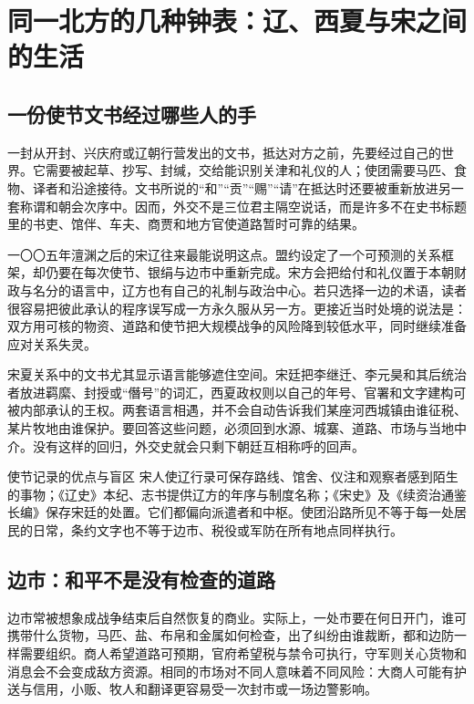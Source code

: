 \section{同一北方的几种钟表：辽、西夏与宋之间的生活}

\subsection{一份使节文书经过哪些人的手}

一封从开封、兴庆府或辽朝行营发出的文书，抵达对方之前，先要经过自己的世界。它需要被起草、抄写、封缄，交给能识别关津和礼仪的人；使团需要马匹、食物、译者和沿途接待。文书所说的“和”“贡”“赐”“请”在抵达时还要被重新放进另一套称谓和朝会次序中。因而，外交不是三位君主隔空说话，而是许多不在史书标题里的书吏、馆伴、车夫、商贾和地方官使道路暂时可靠的结果。

一〇〇五年澶渊之后的宋辽往来最能说明这点。盟约设定了一个可预测的关系框架，却仍要在每次使节、银绢与边市中重新完成。宋方会把给付和礼仪置于本朝财政与名分的语言中，辽方也有自己的礼制与政治中心。若只选择一边的术语，读者很容易把彼此承认的程序误写成一方永久服从另一方。更接近当时处境的说法是：双方用可核的物资、道路和使节把大规模战争的风险降到较低水平，同时继续准备应对关系失灵。

宋夏关系中的文书尤其显示语言能够遮住空间。宋廷把李继迁、李元昊和其后统治者放进羁縻、封授或“僭号”的词汇，西夏政权则以自己的年号、官署和文字建构可被内部承认的王权。两套语言相遇，并不会自动告诉我们某座河西城镇由谁征税、某片牧地由谁保护。要回答这些问题，必须回到水源、城寨、道路、市场与当地中介。没有这样的回归，外交史就会只剩下朝廷互相称呼的回声。

\begin{sourcenote}{使节记录的优点与盲区}
宋人使辽行录可保存路线、馆舍、仪注和观察者感到陌生的事物；《辽史》本纪、志书提供辽方的年序与制度名称；《宋史》及《续资治通鉴长编》保存宋廷的处置。它们都偏向派遣者和中枢。使团沿路所见不等于每一处居民的日常，条约文字也不等于边市、税役或军防在所有地点同样执行。
\end{sourcenote}

\subsection{边市：和平不是没有检查的道路}

边市常被想象成战争结束后自然恢复的商业。实际上，一处市要在何日开门，谁可携带什么货物，马匹、盐、布帛和金属如何检查，出了纠纷由谁裁断，都和边防一样需要组织。商人希望道路可预期，官府希望税与禁令可执行，守军则关心货物和消息会不会变成敌方资源。相同的市场对不同人意味着不同风险：大商人可能有护送与信用，小贩、牧人和翻译更容易受一次封市或一场边警影响。

